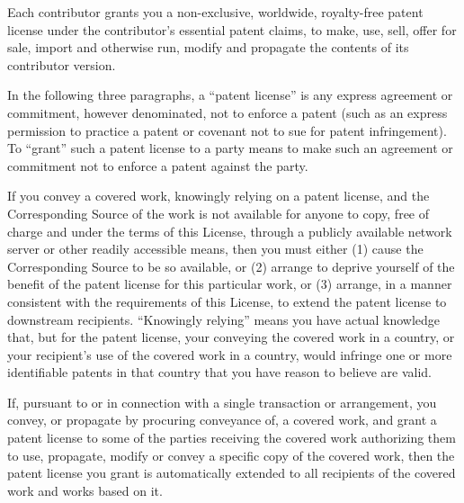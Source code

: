 \documentclass[10pt,a4paper,ngerman,titlepage,tocindentauto]{article}
\begin{document}
\begin{multicols}{3}
{\begin{enumerate}
						Each contributor grants you a non-exclusive, worldwide, royalty-free
						patent license under the contributor's essential patent claims, to
						make, use, sell, offer for sale, import and otherwise run, modify and
						propagate the contents of its contributor version.

						In the following three paragraphs, a ``patent license'' is any express
						agreement or commitment, however denominated, not to enforce a patent
						(such as an express permission to practice a patent or covenant not to
						sue for patent infringement).  To ``grant'' such a patent license to a
						party means to make such an agreement or commitment not to enforce a
						patent against the party.

						If you convey a covered work, knowingly relying on a patent license,
						and the Corresponding Source of the work is not available for anyone
						to copy, free of charge and under the terms of this License, through a
						publicly available network server or other readily accessible means,
						then you must either (1) cause the Corresponding Source to be so
						available, or (2) arrange to deprive yourself of the benefit of the
						patent license for this particular work, or (3) arrange, in a manner
						consistent with the requirements of this License, to extend the patent
						license to downstream recipients.  ``Knowingly relying'' means you have
						actual knowledge that, but for the patent license, your conveying the
						covered work in a country, or your recipient's use of the covered work
						in a country, would infringe one or more identifiable patents in that
						country that you have reason to believe are valid.

						If, pursuant to or in connection with a single transaction or
						arrangement, you convey, or propagate by procuring conveyance of, a
						covered work, and grant a patent license to some of the parties
						receiving the covered work authorizing them to use, propagate, modify
						or convey a specific copy of the covered work, then the patent license
						you grant is automatically extended to all recipients of the covered
						work and works based on it.


\end{enumerate}}
\end{multicols}
\end{document}
